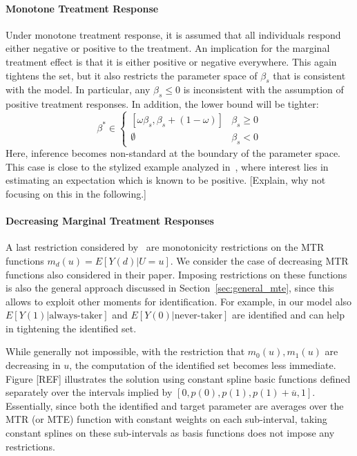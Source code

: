 \documentclass[12pt,a4paper,english]{article} %
\numberwithin{equation}{section}
\numberwithin{figure}{section}
\numberwithin{table}{section}
\begin{document}
\paragraph{Monotone Treatment Response}
Under monotone treatment response, it is assumed that all individuals respond either negative or positive to the treatment.
An implication for the marginal treatment effect is that it is either positive or negative everywhere.
This again tightens the set, but it also restricts the parameter space of $\beta_s$ that is consistent with the model.
In particular, any $\beta_s \leq 0$ is inconsistent with the assumption of positive treatment responses.
In addition, the lower bound will be tighter:
\begin{equation*}
  \beta^* \in \begin{cases}
    [\omega\beta_s, \beta_s + (1 - \omega)] & \beta_s \geq 0 \\
    \emptyset & \beta_s < 0
  \end{cases}
\end{equation*}
Here, inference becomes non-standard at the boundary of the parameter space.
This case is close to the stylized example analyzed in~\cite{andrews1999estimation}, where interest lies in estimating an expectation which is known to be positive.
[Explain, why not focusing on this in the following.]

\paragraph{Decreasing Marginal Treatment Responses}
A last restriction considered by~\cite{mogstad2018using} are monotonicity restrictions on the MTR functions $m_d(u) = E[Y(d)|U=u]$.
We consider the case of decreasing MTR functions also considered in their paper.
Imposing restrictions on these functions is also the general approach discussed in Section~\ref{sec:general_mte}, since this allows to exploit other moments for identification.
For example, in our model also $E[Y(1)|\text{always-taker}]$ and $E[Y(0)|\text{never-taker}]$ are identified and can help in tightening the identified set.

While generally not impossible, with the restriction that $m_0(u), m_1(u)$ are decreasing in $u$, the computation of the identified set becomes less immediate.
Figure [REF] illustrates the solution using constant spline basic functions defined separately over the intervals implied by $[0, p(0), p(1), p(1) + \overline{u}, 1]$.
Essentially, since both the identified and target parameter are averages over the MTR (or MTE) function with constant weights on each sub-interval, taking constant splines on these sub-intervals as basis functions does not impose any restrictions.
\end{document}
